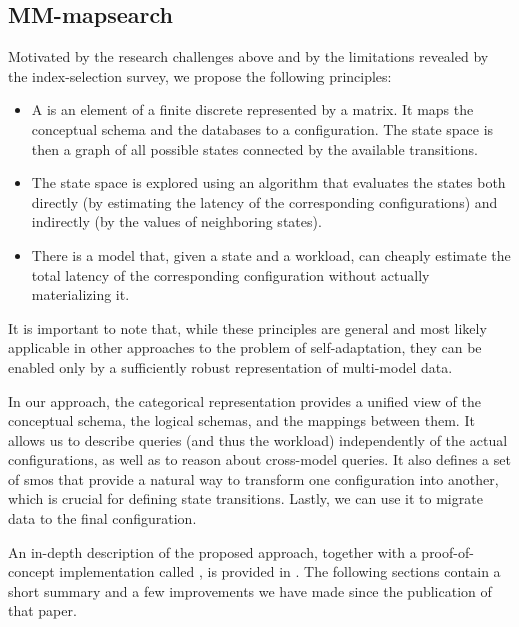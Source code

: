 
\subsection{MM-mapsearch}

Motivated by the research challenges above and by the limitations revealed by the index-selection survey, we propose the following principles:
\begin{itemize}
    \item A  is an element of a finite discrete  represented by a matrix. It maps the conceptual schema and the databases to a configuration. The state space is then a graph of all possible states connected by the available transitions.
    \item The state space is explored using an algorithm that evaluates the states both directly (by estimating the latency of the corresponding configurations) and indirectly (by the values of neighboring states).
    \item There is a model that, given a state and a workload, can cheaply estimate the total latency of the corresponding configuration without actually materializing it.
\end{itemize}
It is important to note that, while these principles are general and most likely applicable in other approaches to the problem of self-adaptation, they can be enabled only by a sufficiently robust representation of multi-model data.

In our approach, the categorical representation provides a unified view of the conceptual schema, the logical schemas, and the mappings between them. It allows us to describe queries (and thus the workload) independently of the actual configurations, as well as to reason about cross-model queries. It also defines a set of \acrshort{smo}s that provide a natural way to transform one configuration into another, which is crucial for defining state transitions. Lastly, we can use it to migrate data to the final configuration.

An in-depth description of the proposed approach, together with a proof-of-concept implementation called , is provided in . The following sections contain a short summary and a few improvements we have made since the publication of that paper.

